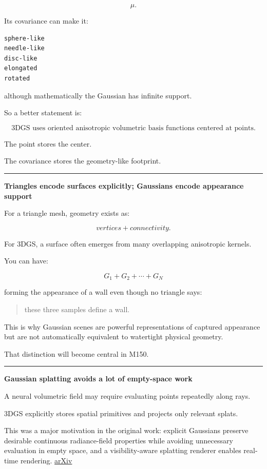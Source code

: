 \[
\mu.
\]

Its covariance can make it:

\begin{verbatim}
sphere-like
needle-like
disc-like
elongated
rotated
\end{verbatim}

although mathematically the Gaussian has infinite support.

So a better statement is:

\[
\boxed{
\text{3DGS uses oriented anisotropic volumetric basis functions centered at points.}
}
\]

The point stores the center.

The covariance stores the geometry-like footprint.

\begin{center}\rule{0.5\linewidth}{0.5pt}\end{center}

\textbf{Triangles encode surfaces explicitly; Gaussians encode appearance support}

For a triangle mesh, geometry exists as:

\[
vertices + connectivity.
\]

For 3DGS, a surface often emerges from many overlapping anisotropic kernels.

You can have:

\[
G_1+G_2+\cdots+G_N
\]

forming the appearance of a wall even though no triangle says:

\begin{quote}
these three samples define a wall.
\end{quote}

This is why Gaussian scenes are powerful representations of captured appearance but are not automatically equivalent to watertight physical geometry.

That distinction will become central in M150.

\begin{center}\rule{0.5\linewidth}{0.5pt}\end{center}

\textbf{Gaussian splatting avoids a lot of empty-space work}

A neural volumetric field may require evaluating points repeatedly along rays.

3DGS explicitly stores spatial primitives and projects only relevant splats.

This was a major motivation in the original work: explicit Gaussians preserve desirable continuous radiance-field properties while avoiding unnecessary evaluation in empty space, and a visibility-aware splatting renderer enables real-time rendering. \href{https://arxiv.org/abs/2308.04079?utm_source=chatgpt.com}{arXiv}

